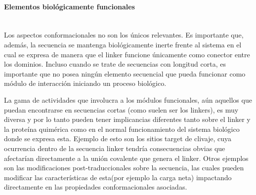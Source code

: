 \paragraph{Elementos biológicamente funcionales} \hspace{0pt} \\
% 
% 
Los aspectos conformacionales no son los únicos relevantes. 
Es importante que, además, la secuencia se mantenga biológicamente inerte frente al sistema en el cual se expresa de manera que el linker funcione únicamente como conector entre los dominios.
Incluso cuando se trate de secuencias con longitud corta, es importante que no posea ningún elemento secuencial que pueda funcionar como módulo de interacción iniciando un proceso biológico. 

La gama de actividades que involucra a los módulos funcionales, aún aquellos que puedan encontrarse en secuencias cortas (como suelen ser los linkers), es muy diversa y por lo tanto pueden tener implicancias diferentes 
tanto sobre el linker y la proteína quimérica como en el normal funcionamiento del sistema biológico donde se expresa esta. %
Ejemplo de esto son los sitios target de clivaje, cuya ocurrencia dentro de la secuencia linker tendría consecuencias obvias que afectarían directamente a la unión covalente que genera el linker.
Otros ejemplos son las modificaciones post-traduccionales sobre la secuencia, las cuales pueden modificar las características de esta(por ejemplo la carga neta) impactando directamente en las propiedades conformacionales asociadas.



